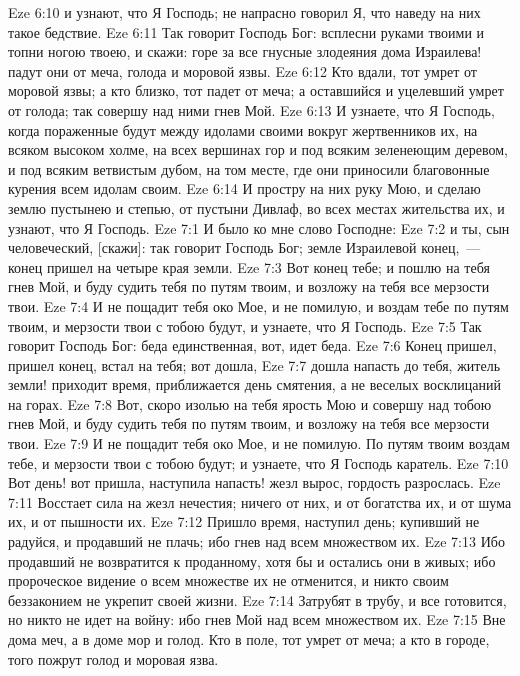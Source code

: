 \vs Eze 6:10 и узнают, что Я Господь; не напрасно говорил Я, что наведу на них такое бедствие.
\vs Eze 6:11 Так говорит Господь Бог: всплесни руками твоими и топни ногою твоею, и скажи: горе за все гнусные злодеяния дома Израилева! падут они от меча, голода и моровой язвы.
\vs Eze 6:12 Кто вдали, тот умрет от моровой язвы; а кто близко, тот падет от меча; а оставшийся и уцелевший умрет от голода; так совершу над ними гнев Мой.
\vs Eze 6:13 И узнаете, что Я Господь, когда пораженные будут  между идолами своими вокруг жертвенников их, на всяком высоком холме, на всех вершинах гор и под всяким зеленеющим деревом, и под всяким ветвистым дубом, на том месте, где они приносили благовонные курения всем идолам своим.
\vs Eze 6:14 И простру на них руку Мою, и сделаю землю пустынею и степью, от пустыни Дивлаф, во всех местах жительства их, и узнают, что Я Господь.
\vs Eze 7:1 И было ко мне слово Господне:
\vs Eze 7:2 и ты, сын человеческий, [скажи]: так говорит Господь Бог; земле Израилевой конец,~--- конец пришел на четыре края земли.
\vs Eze 7:3 Вот конец тебе; и пошлю на тебя гнев Мой, и буду судить тебя по путям твоим, и возложу на тебя все мерзости твои.
\vs Eze 7:4 И не пощадит тебя око Мое, и не помилую, и воздам тебе по путям твоим, и мерзости твои с тобою будут, и узнаете, что Я Господь.
\vs Eze 7:5 Так говорит Господь Бог: беда единственная, вот, идет беда.
\vs Eze 7:6 Конец пришел, пришел конец, встал на тебя; вот дошла,
\vs Eze 7:7 дошла напасть до тебя, житель земли! приходит время, приближается день смятения, а не веселых восклицаний на горах.
\vs Eze 7:8 Вот, скоро изолью на тебя ярость Мою и совершу над тобою гнев Мой, и буду судить тебя по путям твоим, и возложу на тебя все мерзости твои.
\vs Eze 7:9 И не пощадит тебя око Мое, и не помилую. По путям твоим воздам тебе, и мерзости твои с тобою будут; и узнаете, что Я Господь каратель.
\vs Eze 7:10 Вот день! вот пришла, наступила напасть! жезл вырос, гордость разрослась.
\vs Eze 7:11 Восстает сила на жезл нечестия; ничего  от них, и от богатства их, и от шума их, и от пышности их.
\vs Eze 7:12 Пришло время, наступил день; купивший не радуйся, и продавший не плачь; ибо гнев над всем множеством их.
\vs Eze 7:13 Ибо продавший не возвратится к проданному, хотя бы и остались они в живых; ибо пророческое видение о всем множестве их не отменится, и никто своим беззаконием не укрепит своей жизни.
\vs Eze 7:14 Затрубят в трубу, и все готовится, но никто не идет на войну: ибо гнев Мой над всем множеством их.
\vs Eze 7:15 Вне дома меч, а в доме мор и голод. Кто в поле, тот умрет от меча; а кто в городе, того пожрут голод и моровая язва.
